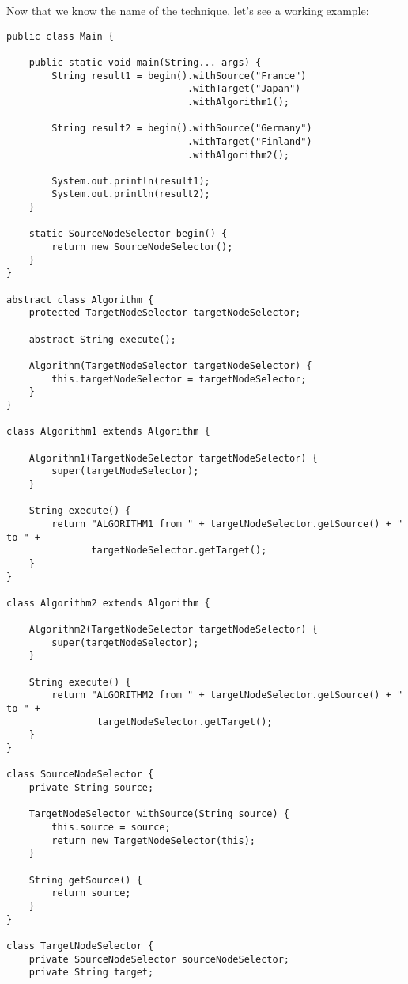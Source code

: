 \documentclass{book}
\begin{document}
Now that we know the name of the technique, let's see a working example:
\lstset{
  numbers=left
}
\begin{lstlisting}
public class Main {
    
    public static void main(String... args) {
        String result1 = begin().withSource("France")
                                .withTarget("Japan")
                                .withAlgorithm1();
        
        String result2 = begin().withSource("Germany")
                                .withTarget("Finland")
                                .withAlgorithm2();
        
        System.out.println(result1);
        System.out.println(result2);
    }
    
    static SourceNodeSelector begin() {
        return new SourceNodeSelector();
    }
}

abstract class Algorithm {
    protected TargetNodeSelector targetNodeSelector;
    
    abstract String execute();
    
    Algorithm(TargetNodeSelector targetNodeSelector) {
        this.targetNodeSelector = targetNodeSelector;
    }
}

class Algorithm1 extends Algorithm {
    
    Algorithm1(TargetNodeSelector targetNodeSelector) {
        super(targetNodeSelector);
    }
    
    String execute() {
        return "ALGORITHM1 from " + targetNodeSelector.getSource() + " to " +
               targetNodeSelector.getTarget();
    }
}

class Algorithm2 extends Algorithm {
    
    Algorithm2(TargetNodeSelector targetNodeSelector) {
        super(targetNodeSelector);
    }
    
    String execute() {
        return "ALGORITHM2 from " + targetNodeSelector.getSource() + " to " +
                targetNodeSelector.getTarget();
    }
}

class SourceNodeSelector {
    private String source;
    
    TargetNodeSelector withSource(String source) {
        this.source = source;
        return new TargetNodeSelector(this);
    }
    
    String getSource() {
        return source;
    }
}

class TargetNodeSelector {
    private SourceNodeSelector sourceNodeSelector;
    private String target;
    

\end{lstlisting}
\end{document}
